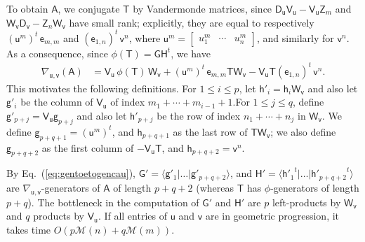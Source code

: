 \documentclass[sigconf]{acmart}
\newcommand{\ve}{\ensuremath{\mathsf{e}}}
\newcommand{\vg}{\ensuremath{\mathsf{g}}}
\newcommand{\vh}{\ensuremath{\mathsf{h}}}
\newcommand{\vu}{\ensuremath{\mathsf{u}}}
\newcommand{\vv}{\ensuremath{\mathsf{v}}}
\newcommand{\mA}{\ensuremath{\mathsf{A}}}
\newcommand{\mD}{\ensuremath{\mathsf{D}}}
\newcommand{\mG}{\ensuremath{\mathsf{G}}}
\newcommand{\mH}{\ensuremath{\mathsf{H}}}
\newcommand{\mT}{\ensuremath{\mathsf{T}}}
\newcommand{\mV}{\ensuremath{\mathsf{V}}}
\newcommand{\mW}{\ensuremath{\mathsf{W}}}
\newcommand{\mZ}{\ensuremath{\mathsf{Z}}}
\newcommand{\M}{\ensuremath{\mathscr{M}}}
\theoremstyle{acmdefinition}
\begin{document}
To obtain $\mA$, we conjugate $\mT$ by Vandermonde matrices, since $
\mD_{\vu} \mV_{\vu} - \mV_{\vu} \mZ_m$ and $ \mW_{\vv} \mD_{\vv} -
\mZ_n \mW_{\vv}$ have small rank; explicitly, they are equal to
respectively $(\vu^m)^t \, \ve_{m,m}$ and $(\ve_{1,n})^t \, \vv^n$,
where $\vu^m = \begin{bmatrix} u_1^m & \cdots & u_n^m \end{bmatrix}$,
and similarly for $\vv^n$. As a
consequence, since $\phi(\mT)=\mG \mH^t$, we have
\begin{align}\label{eq:gentoetogencau}
  \nabla_{\vu, \vv} \left( \mA \right) 
  & =  \mV_{\vu}\, \phi(\mT)\, \mW_{\vv} 
  + (\vu^m)^t \, \ve_{m,m}  \mT  \mW_{\vv} 
        - \mV_{\vu}  \mT  (\ve_{1,n})^t \, \vv^n. 
\end{align}
This motivates the following definitions. For $1 \le i \le p$, let
$\vh'_i=\vh_i \mW_\vv$ and also let $\vg'_{i}$ be the column of
$\mV_\vu$ of index $m_1 + \cdots +m_{i-1}+1$.For $1 \le j \le q$,
define $\vg'_{p+j} = \mV_\vu \vg_{p+j}$ and also let $\vh'_{p+j}$ be
the row of index $n_1 + \cdots +n_j$ in $\mW_\vv$.  We define
$\vg_{p+q+1} = (\vu^m)^t$, and $\vh_{p+q+1}$ as the last row of
$\mT \mW_\vv$; we also define $\vg_{p+q+2}$ as the first column of
$-\mV_\vu \mT$, and $\vh_{p+q+2} = \vv^n$.

By Eq.~(\ref{eq:gentoetogencau}),
$\mG'= \langle \vg'_1 | \dots | \vg'_{p+q+2}\rangle$, and
$\mH' = \langle {\vh'_1}^t | \dots | {\vh'_{p+q+2}}^t\rangle$ are
$\nabla_{\vu,\vv}$-generators of $\mA$ of length $p+q+2$ (whereas
$\mT$ has $\phi$-generators of length $p+q$). The bottleneck in the
computation of $\mG'$ and $\mH'$ are $p$ left-products by $\mW_\vv$
and $q$ products by $\mV_\vu$.  If all entries of $\vu$ and $\vv$ are
in geometric progression, it takes time $O(p \M(n) + q \M(m))$.
\end{document}
